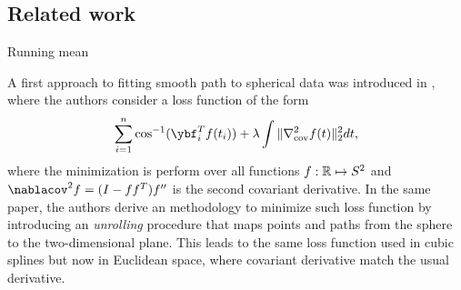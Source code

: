 \subsection{Related work}

Running mean

A first approach to fitting smooth path to spherical data was introduced in \cite{Jupp-1987-spherical}, where the authors consider a loss function of the form 
\begin{equation}
    \sum_{i=1}^n \cos^{-1}(\ybf_i^T f(t_i))
    + 
    \lambda
    \int \| \nabla_\text{cov}^2 f(t) \|_2^2 dt,
    \label{eq:jupp_splines_sphere}
\end{equation}
where the minimization is perform over all functions $f: \operatorname{\mathbb{R}} \mapsto S^2$ and $\nablacov^2 f  = (I - ff^T) f''$ is the second covariant derivative. In the same paper, the authors derive an methodology to minimize such loss function by introducing an \textit{unrolling} procedure that maps points and paths from the sphere to the two-dimensional plane. This leads to the same loss function used in cubic splines but now in Euclidean space, where covariant derivative match the usual derivative. 